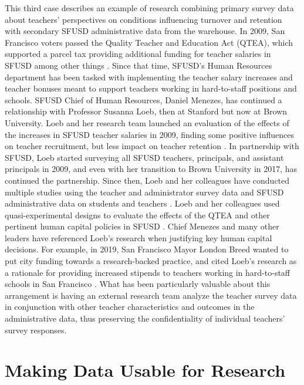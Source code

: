 This third case describes an example of research combining primary survey data about teachers' perspectives on conditions influencing turnover and retention with secondary SFUSD administrative data from the warehouse. In 2009, San Francisco voters passed the Quality Teacher and Education Act (QTEA), which supported a parcel tax providing additional funding for teacher salaries in SFUSD among other things \citep{hough2009}. Since that time, SFUSD's Human Resources department has been tasked with implementing the teacher salary increases and teacher bonuses meant to support teachers working in hard-to-staff positions and schools. SFUSD Chief of Human Resources, Daniel Menezes, has continued a relationship with Professor Susanna Loeb, then at Stanford but now at Brown University. Loeb and her research team launched an evaluation of the effects of the increases in SFUSD teacher salaries in 2009, finding some positive influences on teacher recruitment, but less impact on teacher retention \citep{hough2013}. In partnership with SFUSD, Loeb started surveying all SFUSD teachers, principals, and assistant principals in 2009, and even with her transition to Brown University in 2017, has continued the partnership. Since then, Loeb and her colleagues have conducted multiple studies using the teacher and administrator survey data and SFUSD administrative data on students and teachers \citep{dizon-ross2019}. Loeb and her colleagues used quasi-experimental designs to evaluate the effects of the QTEA and other pertinent human capital policies in SFUSD \citep{sun2017}. Chief Menezes and many other leaders have referenced Loeb's research when justifying key human capital decisions. For example, in 2019, San Francisco Mayor London Breed wanted to put city funding towards a research-backed practice, and cited Loeb's research as a rationale for providing increased stipends to teachers working in hard-to-staff schools in San Francisco \citep{waxmann2019}. What has been particularly valuable about this arrangement is having an external research team analyze the teacher survey data in conjunction with other teacher characteristics and outcomes in the administrative data, thus preserving the confidentiality of individual teachers' survey responses.

\hypertarget{making-data-usable-for-research-3}{%
\section{Making Data Usable for Research}\label{making-data-usable-for-research-3}}

